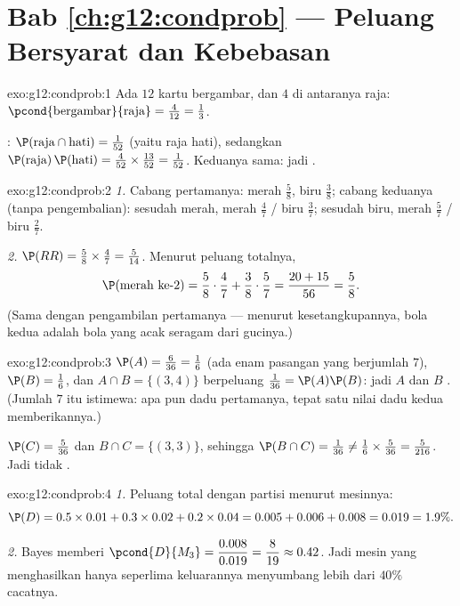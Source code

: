 \section*{Bab \ref{ch:g12:condprob} --- Peluang Bersyarat dan Kebebasan}

\begin{solution}{exo:g12:condprob:1}
Ada $12$ kartu bergambar, dan $4$ di antaranya raja:
$\pcond{\text{bergambar}}{\text{raja}} = \frac{4}{12} = \frac13$.

: $\P(\text{raja} \cap \text{hati}) = \frac{1}{52}$ (yaitu raja
hati), sedangkan
$\P(\text{raja})\,\P(\text{hati}) = \frac{4}{52}\times\frac{13}{52}
= \frac{1}{52}$. Keduanya sama: jadi  .
\end{solution}

\begin{solution}{exo:g12:condprob:2}
\emph{1.} Cabang pertamanya: merah $\frac58$, biru $\frac38$; cabang keduanya
(tanpa pengembalian): sesudah merah, merah $\frac47$ / biru $\frac37$; sesudah
biru, merah $\frac57$ / biru $\frac27$.

\emph{2.} $\P(RR) = \frac58 \times \frac47 = \frac{5}{14}$. Menurut peluang
totalnya,
\[
\P(\text{merah ke-2}) = \frac58\cdot\frac47 + \frac38\cdot\frac57
= \frac{20 + 15}{56} = \frac58 .
\]
(Sama dengan pengambilan pertamanya --- menurut kesetangkupannya, bola kedua adalah
bola yang acak seragam dari gucinya.)
\end{solution}

\begin{solution}{exo:g12:condprob:3}
$\P(A) = \frac{6}{36} = \frac16$ (ada enam pasangan yang berjumlah $7$),
$\P(B) = \frac16$, dan $A \cap B = \{(3,4)\}$ berpeluang
$\frac{1}{36} = \P(A)\P(B)$: jadi $A$ dan $B$ . (Jumlah $7$ itu
istimewa: apa pun dadu pertamanya, tepat satu nilai dadu kedua memberikannya.)

$\P(C) = \frac{5}{36}$ dan $B \cap C = \{(3,3)\}$, sehingga
$\P(B \cap C) = \frac{1}{36} \neq \frac16 \times \frac{5}{36}
= \frac{5}{216}$. Jadi tidak .
\end{solution}

\begin{solution}{exo:g12:condprob:4}
\emph{1.} Peluang total dengan partisi menurut mesinnya:
\[
\P(D) = 0.5\times0.01 + 0.3\times0.02 + 0.2\times0.04
= 0.005 + 0.006 + 0.008 = 0.019 = 1.9\% .
\]

\emph{2.} Bayes memberi
$\pcond{D}{M_3} = \dfrac{0.008}{0.019} = \dfrac{8}{19} \approx 0.42$. Jadi
mesin yang menghasilkan hanya seperlima keluarannya menyumbang lebih dari $40\%$
cacatnya.
\end{solution}

